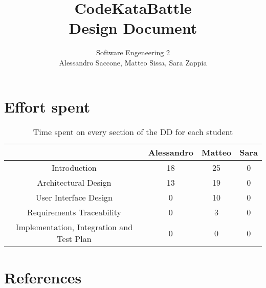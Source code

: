 \documentclass[12pt,a4paper]{article}
\title{CodeKataBattle\\ Design Document}
\author{Software Engeneering 2\\
       Alessandro Saccone, Matteo Sissa, Sara Zappia}
\begin{document}
\maketitle

\newpage
\tableofcontents











\section{Effort spent}
\begin{table}[h]
  \centering
  \begin{tabular}{|c|c|c|c|}
    \hline
      & Alessandro & Matteo & Sara \\
    \hline
    Introduction & 18 & 25 & 0 \\
    \hline
    Architectural Design & 13 & 19 & 0 \\
    \hline
    User Interface Design & 0 & 10 & 0 \\ 
    \hline
    Requirements Traceability & 0 & 3 & 0  \\
    \hline
    Implementation, Integration and Test Plan & 0 & 0 & 0 \\
    \hline
    
  \end{tabular}
  \caption{Time spent on every section of the DD for each student}
  \label{tab:effort}
\end{table}

\section{References}
%
%
\end{document}
